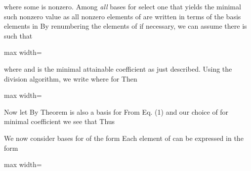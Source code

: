 \documentclass[11pt,oneside]{article}
\begin{document}
\begin{BookBody}
\noindent where some  is nonzero. Among\textit{ all} bases  for  select one  that yields the minimal such nonzero value  as all nonzero elements of  are written in terms of the basis elements in  By renumbering the elements of  if necessary, we can assume there is  such that

\begin{center}\begin{adjustbox}{max width=\linewidth}\end{adjustbox}\end{center}

\noindent where  and  is the minimal attainable coefficient as just described. Using the division algorithm, we write  where  for  Then

\begin{center}\begin{adjustbox}{max width=\linewidth}\end{adjustbox}\end{center}

\noindent Now let  By Theorem  is also a basis for  From Eq. (1) and our choice of  for minimal coefficient  we see that  Thus 

We now consider bases for  of the form  Each element of  can be expressed in the form

\begin{center}\begin{adjustbox}{max width=\linewidth}\end{adjustbox}\end{center}

\end{BookBody}
\end{document}
